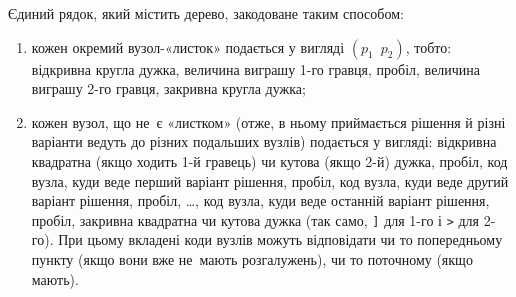 



\InputFile
Єдиний рядок, який містить дерево, закодоване таким способом:
\begin{enumerate}
\item
кожен окремий вузол-«листок» подається у вигляді $(p_1\,\,\,p_2)$, тобто: відкривна кругла дужка, величина виграшу 1-го гравця, пробіл, величина виграшу 2-го гравця, закривна кругла дужка;
\item
кожен вузол, що не~є «листком» (отже, в ньому приймається рішення й різні варіанти ведуть до різних подальших вузлів) подається у вигляді: відкривна квадратна (якщо ходить 1-й гравець) чи кутова (якщо 2-й) дужка, пробіл, код вузла, куди веде перший варіант рішення, пробіл, код вузла, куди веде др{\it у}гий варіант рішення, пробіл, \dots, код вузла, куди веде останній варіант рішення, пробіл, закривна квадратна чи кутова дужка (так само, \texttt{]} для 1-го і \texttt{>} для 2-го).
При цьому вкладені коди вузлів можуть відповідати чи то попередньому пункту (якщо вони вже не~мають розгалужень), чи то поточному (якщо мають).
\end{enumerate}

